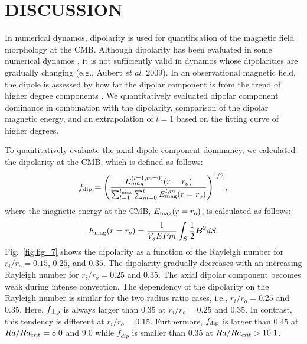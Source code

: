 \section{DISCUSSION}

In numerical dynamos, dipolarity is used for quantification of the magnetic field morphology at the CMB. 
Although dipolarity has been evaluated in some numerical dynamos \cite{Uli:2006,Soderlund:2012}, it is not sufficiently valid in dynamos whose dipolarities are gradually changing (e.g., Aubert {\it et al.} 2009).
In an observational magnetic field, the dipole is assessed by how far the dipolar component is from the trend of higher degree components \cite{Lowes:1974,Langel:1982}. 
We quantitatively evaluated dipolar component dominance in combination with the dipolarity, comparison of the dipolar magnetic energy, and an extrapolation of $l = 1$ based on the fitting curve of higher degrees.

To quantitatively evaluate the axial dipole component dominancy, we calculated the dipolarity at the CMB, which is defined as follows:
%
\begin{equation}
f_{\rm dip} = 
\left(
\frac{E_{mag}^{(l=1,m=0)} (r=r_o)}
     {\sum_{l=1}^{l_{\rm max}}
      \sum_{m=0}^l E_{\rm mag}^{l,m} (r=r_o)}
\right)^{1/2},
\label{eq:f_dip}
\end{equation}
%
where the magnetic energy at the CMB, $E_{\rm mag} (r=r_o)$, is calculated as follows:
%
\begin{equation}
E_{\rm mag} (r=r_o) = 
  \frac{1}{V_s E Pm} \int_S \frac{1}{2} \mbox{\boldmath$B$}^2 dS.
\end{equation}
%
Fig.~\ref{fig:fig_7} shows the dipolarity as a function of the Rayleigh number for $r_i/r_o = 0.15$, $0.25$, and $0.35$. 
The dipolarity gradually decreases with an increasing Rayleigh number for $r_i/r_o = 0.25$ and $0.35$. 
The axial dipolar component becomes weak during intense convection. 
The dependency of the dipolarity on the Rayleigh number is similar for the two radius ratio cases, i.e., $r_i/r_o = 0.25$ and $0.35$. 
Here, $f_{\rm dip}$ is always larger than $0.35$ at $r_i/r_o = 0.25$ and $0.35$. 
In contrast, this tendency is different at $r_i/r_o = 0.15$. 
Furthermore, $f_{\rm dip}$ is larger than $0.45$ at $Ra/Ra_{\rm crit} = 8.0$ and $9.0$ while $f_{dip}$ is smaller than $0.35$ at $Ra/Ra_{\rm crit} > 10.1$.

